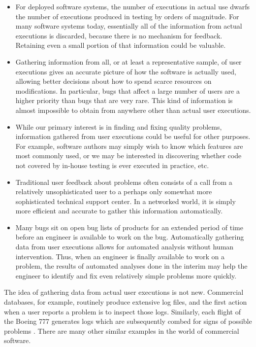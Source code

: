 \begin{itemize}
  
\item For deployed software systems, the number of executions in
  actual use dwarfs the number of executions produced in testing by
  orders of magnitude.  For many software systems today, essentially
  all of the information from actual executions is discarded, because
  there is no mechanism for feedback.  Retaining even a small portion
  of that information could be valuable.
  
\item Gathering information from all, or at least a representative
  sample, of user executions gives an accurate picture of how the
  software is actually used, allowing better decisions about how to
  spend scarce resources on modifications. In particular, bugs that
  affect a large number of users are a higher priority than bugs that
  are very rare.  This kind of information is almost impossible to
  obtain from anywhere other than actual user executions.
  
\item While our primary interest is in finding and fixing quality
  problems, information gathered from user executions could be useful
  for other purposes.  For example, software authors may simply wish
  to know which features are most commonly used, or we may be
  interested in discovering whether code not covered by in-house
  testing is ever executed in practice, etc.
  
\item Traditional user feedback about problems often consists of a
  call from a relatively unsophisticated user to a perhaps only
  somewhat more sophisticated technical support center.  In a
  networked world, it is simply more efficient and accurate to gather
  this information automatically.
  
\item Many bugs sit on open bug lists of products for an extended
  period of time before an engineer is available to work on the bug.
  Automatically gathering data from user executions allows for
  automated analysis without human intervention.  Thus, when an
  engineer is finally available to work on a problem, the results of
  automated analyses done in the interim may help the engineer to
  identify and fix even relatively simple problems more quickly.
\end{itemize}

The idea of gathering data from actual user executions is not new.
Commercial databases, for example, routinely produce extensive log
files, and the first action when a user reports a problem is to
inspect those logs.  Similarly, each flight of the Boeing 777
generates logs which are subsequently combed for signs of possible
problems \cite{Esler:2001:WVR}.  There are many other similar examples
in the world of commercial software.

